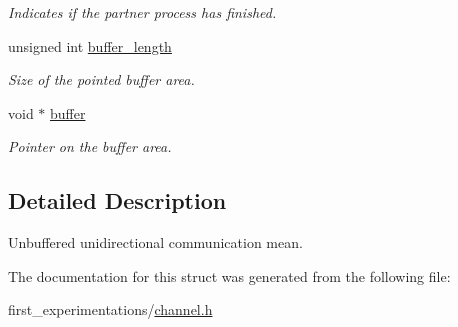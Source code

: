 \begin{DoxyCompactItemize}
\begin{DoxyCompactList}\small\item\em Indicates if the partner process has finished. \end{DoxyCompactList}\item 
\hypertarget{structchannel__t_a74cdeb703c27a61b90a0dc435cddec29}{unsigned int \hyperlink{structchannel__t_a74cdeb703c27a61b90a0dc435cddec29}{buffer\-\_\-length}}\label{structchannel__t_a74cdeb703c27a61b90a0dc435cddec29}

\begin{DoxyCompactList}\small\item\em Size of the pointed buffer area. \end{DoxyCompactList}\item 
\hypertarget{structchannel__t_a2aa54fcb1c2ef0675bb3b9b1b775b39e}{void $\ast$ \hyperlink{structchannel__t_a2aa54fcb1c2ef0675bb3b9b1b775b39e}{buffer}}\label{structchannel__t_a2aa54fcb1c2ef0675bb3b9b1b775b39e}

\begin{DoxyCompactList}\small\item\em Pointer on the buffer area. \end{DoxyCompactList}\end{DoxyCompactItemize}


\subsection{Detailed Description}
Unbuffered unidirectional communication mean. 

The documentation for this struct was generated from the following file\-:\begin{DoxyCompactItemize}
\item 
first\-\_\-experimentations/\hyperlink{channel_8h}{channel.\-h}\end{DoxyCompactItemize}
